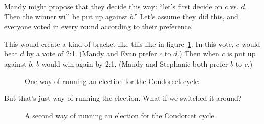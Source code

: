Mandy might propose that they decide this way: ``let's first decide on $c$ vs. $d$. Then the winner will be put up against $b$.''  Let's assume they did this, and everyone voted in every round according to their preference.

This would create a kind of bracket like this like in figure~\ref{f:cc-first-vote}.  In this vote, $c$ would beat $d$ by a vote of 2:1.  (Mandy and Evan prefer $c$ to $d$.) Then when $c$ is put up against $b$, $b$ would win again by 2:1. (Mandy and Stephanie both prefer $b$ to $c$.)

\begin{figure}
\centering
{}
\label{f:cc-first-vote}
\caption{One way of running an election for the Condorcet cycle}
\end{figure}

But that's just way of running the election.  What if we switched it around? 

\begin{figure}
\centering
{}
\label{f:cc-second-vote}
\caption{A second way of running an election for the Condorcet cycle}
\end{figure}

